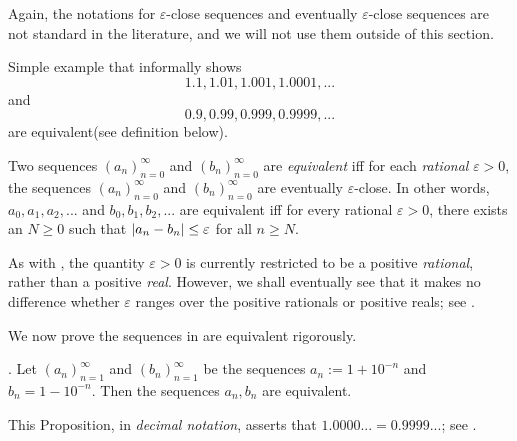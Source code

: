 \begin{remark} \label{remark 5.2.4}
Again, the notations for \(\varepsilon\)-close sequences and eventually \(\varepsilon\)-close sequences are not standard in the literature, and we will not use them outside of this section.
\end{remark}

\begin{example} \label{example 5.2.5}
Simple example that informally shows
\[
    1.1, 1.01, 1.001, 1.0001,...
\]
and
\[
    0.9, 0.99, 0.999, 0.9999,...
\]
are equivalent(see definition below).
\end{example}

\begin{definition}  \label{def 5.2.6}
Two sequences \((a_n)_{n = 0}^{\infty}\) and \((b_n)_{n = 0}^{\infty}\) are \emph{equivalent}
iff for each \emph{rational} \(\varepsilon > 0\), the sequences \((a_n)_{n = 0}^{\infty}\) and \((b_n)_{n = 0}^{\infty}\) are eventually \(\varepsilon\)-close.
In other words, \(a_0, a_1, a_2,...\) and \(b_0, b_1, b_2,...\) are equivalent
iff for every rational \(\varepsilon > 0\), there exists an \(N \ge 0\) such that \(\lvert a_n - b_n\rvert \le \varepsilon\) for all \(n \ge N\).
\end{definition}

\begin{remark} \label{remark 5.2.7}
As with , the quantity \(\varepsilon > 0\) is currently restricted to be a positive \emph{rational}, rather than a positive \emph{real}.
However, we shall eventually see that it makes no difference whether \(\varepsilon\) ranges over the positive rationals or positive reals;
see .
\end{remark}

We now prove the sequences in  are equivalent rigorously.

\begin{proposition} \label{prop 5.2.8}.
Let \((a_n)_{n = 1}^{\infty}\) and \((b_n)_{n = 1}^{\infty}\) be the sequences
\(a_n := 1 + 10^{-n}\) and \(b_n = 1 - 10^{-n}\).
Then the sequences \(a_n, b_n\) are equivalent.
\end{proposition}

\begin{remark} \label{remark 5.2.9}
This Proposition, in \emph{decimal notation}, asserts that \(1.0000... = 0.9999...\); see .
\end{remark}

